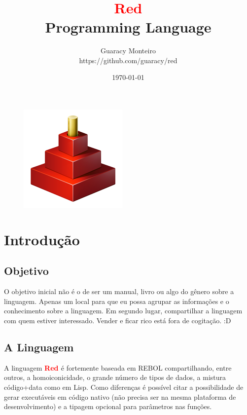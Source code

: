\documentclass[12pt,a4paper]{article}
\title{\huge \textbf{\textcolor{red}{Red}} \\Programming Language}
\author{Guaracy Monteiro \\ \small https://github.com/guaracy/red} %
\date{\today}
\newcommand{\Red}{\textbf{\textcolor{red}{Red }}}
\begin{document}
\begin{titlepage}
\begin{figure}  %
\centering
\includegraphics[scale=1]{Red_Language_Tower_Logo.png}
\end{figure}
\maketitle
\end{titlepage}

\setcounter{tocdepth}{2}

\tableofcontents
\pagebreak
\renewcommand\listingscaption{Listagem}
\renewcommand\listoflistingscaption{Listagens}
\listoflistings
\listoftables
\pagebreak


\section{Introdução}

\subsection{Objetivo}

O objetivo inicial não é o de ser um manual, livro ou algo do gênero sobre a
linguagem. Apenas um local para que eu possa agrupar as informações e o
conhecimento sobre a linguagem. Em segundo lugar, compartilhar a linguagem com
quem estiver interessado. Vender e ficar rico está fora de cogitação. :D

\subsection{A Linguagem}

A linguagem \Red é fortemente baseada em REBOL compartilhando, entre outros, a
homoiconicidade, o grande número de tipos de dados, a mistura código+data como
em Lisp. Como diferenças é possível citar a possibilidade de gerar executáveis
em código nativo (não precisa ser na mesma plataforma de desenvolvimento) e a
tipagem opcional para parâmetros nas funções.
\end{document}
